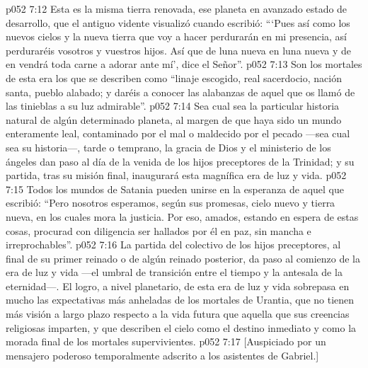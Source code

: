 \vs p052 7:12 Esta es la misma tierra renovada, ese planeta en avanzado estado de desarrollo, que el antiguo vidente visualizó cuando escribió: “‘Pues así como los nuevos cielos y la nueva tierra que voy a hacer perdurarán en mi presencia, así perduraréis vosotros y vuestros hijos. Así que de luna nueva en luna nueva y de  en  vendrá toda carne a adorar ante mí’, dice el Señor”.
\vs p052 7:13 Son los mortales de esta era los que se describen como “linaje escogido, real sacerdocio, nación santa, pueblo alabado; y daréis a conocer las alabanzas de aquel que os llamó de las tinieblas a su luz admirable”.
\vs p052 7:14 \pc Sea cual sea la particular historia natural de algún determinado planeta, al margen de que haya sido un mundo enteramente leal, contaminado por el mal o maldecido por el pecado ---sea cual sea su historia---, tarde o temprano, la gracia de Dios y el ministerio de los ángeles dan paso al día de la venida de los hijos preceptores de la Trinidad; y su partida, tras su misión final, inaugurará esta magnífica era de luz y vida.
\vs p052 7:15 Todos los mundos de Satania pueden unirse en la esperanza de aquel que escribió: “Pero nosotros esperamos, según sus promesas, cielo nuevo y tierra nueva, en los cuales mora la justicia. Por eso, amados, estando en espera de estas cosas, procurad con diligencia ser hallados por él en paz, sin mancha e irreprochables”.
\vs p052 7:16 \pc La partida del colectivo de los hijos preceptores, al final de su primer reinado o de algún reinado posterior, da paso al comienzo de la era de luz y vida ---el umbral de transición entre el tiempo y la antesala de la eternidad---. El logro, a nivel planetario, de esta era de luz y vida sobrepasa en mucho las expectativas más anheladas de los mortales de Urantia, que no tienen más visión a largo plazo respecto a la vida futura que aquella que sus creencias religiosas imparten, y que describen el cielo como el destino inmediato y como la morada final de los mortales supervivientes.
\vsetoff
\vs p052 7:17 [Auspiciado por un mensajero poderoso temporalmente adscrito a los asistentes de Gabriel.]
